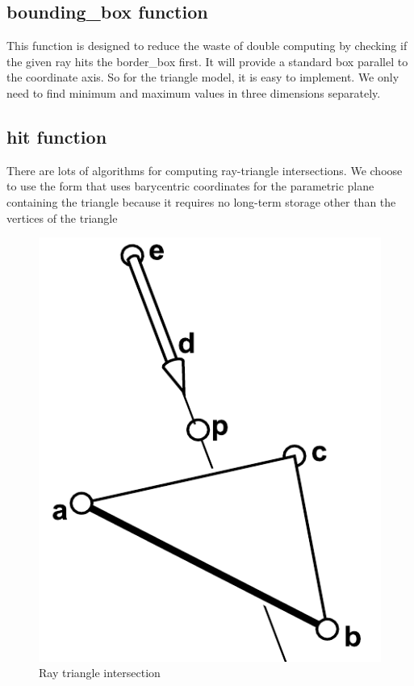 \documentclass[10pt,conference,compsoc]{IEEEtran}
\begin{document}
	\subsection{bounding\_box function}
	This function is designed to reduce the waste of double computing by checking if the given ray hits the border\_box first. It will provide a standard box parallel to the coordinate axis. So for the triangle model, it is easy to implement. We only need to find minimum and maximum values in three dimensions separately.
	
	\subsection{hit function}	
	There are lots of algorithms for computing ray-triangle intersections. We choose to use the form that uses barycentric coordinates for the parametric plane containing the triangle because it requires no long-term storage other than the vertices of the triangle \cite{snyder1987ray}
	
	\begin{figure}[H]
		\centering
		\includegraphics[scale=0.3]{./pic/ray_triangle_intersection.png}
		\caption{Ray triangle intersection}
		\label{fig:label}
	\end{figure}
\end{document}
